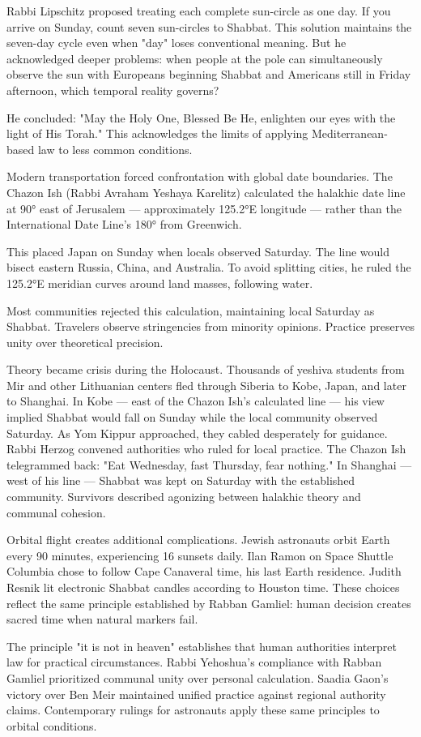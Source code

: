 Rabbi Lipschitz proposed treating each complete sun-circle as one day. If you arrive on Sunday, count seven sun-circles to Shabbat. This solution maintains the seven-day cycle even when "day" loses conventional meaning. But he acknowledged deeper problems: when people at the pole can simultaneously observe the sun with Europeans beginning Shabbat and Americans still in Friday afternoon, which temporal reality governs?

He concluded: "May the Holy One, Blessed Be He, enlighten our eyes with the light of His Torah." This acknowledges the limits of applying Mediterranean-based law to less common conditions.

Modern transportation forced confrontation with global date boundaries. The Chazon Ish (Rabbi Avraham Yeshaya Karelitz) calculated the halakhic date line at 90° east of Jerusalem — approximately 125.2°E longitude — rather than the International Date Line's 180° from Greenwich.

This placed Japan on Sunday when locals observed Saturday. The line would bisect eastern Russia, China, and Australia. To avoid splitting cities, he ruled the 125.2°E meridian curves around land masses, following water.

Most communities rejected this calculation, maintaining local Saturday as Shabbat. Travelers observe stringencies from minority opinions. Practice preserves unity over theoretical precision.

Theory became crisis during the Holocaust. Thousands of yeshiva students from Mir and other Lithuanian centers fled through Siberia to Kobe, Japan, and later to Shanghai. In Kobe — east of the Chazon Ish's calculated line — his view implied Shabbat would fall on Sunday while the local community observed Saturday. As Yom Kippur approached, they cabled desperately for guidance. Rabbi Herzog convened authorities who ruled for local practice. The Chazon Ish telegrammed back: "Eat Wednesday, fast Thursday, fear nothing." In Shanghai — west of his line — Shabbat was kept on Saturday with the established community. Survivors described agonizing between halakhic theory and communal cohesion. 

Orbital flight creates additional complications. Jewish astronauts orbit Earth every 90 minutes, experiencing 16 sunsets daily. Ilan Ramon on Space Shuttle Columbia chose to follow Cape Canaveral time, his last Earth residence. Judith Resnik lit electronic Shabbat candles according to Houston time. These choices reflect the same principle established by Rabban Gamliel: human decision creates sacred time when natural markers fail.

The principle "it is not in heaven" establishes that human authorities interpret law for practical circumstances. Rabbi Yehoshua's compliance with Rabban Gamliel prioritized communal unity over personal calculation. Saadia Gaon's victory over Ben Meir maintained unified practice against regional authority claims. Contemporary rulings for astronauts apply these same principles to orbital conditions.
